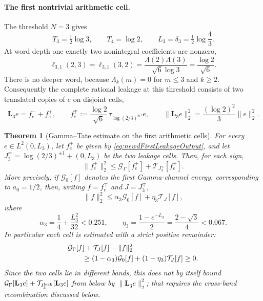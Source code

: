 \documentclass[11pt]{amsart}
\newtheorem{theorem}{Theorem}[section]
\theoremstyle{definition}
\theoremstyle{remark}
\begin{document}
\paragraph{The first nontrivial arithmetic cell.}
The threshold $N=3$ gives
\begin{equation}\label{eq:newdFirstCellLength}
 T_3=\tfrac12\log3,
 \qquad T_4=\log2,
 \qquad L_3=\delta_3=\tfrac12\log\frac43.
\end{equation}
At word depth one exactly two nonintegral coefficients are nonzero,
\begin{equation}\label{eq:newdFirstLeakageCoefficient}
 \ell_{3,1}(2,3)=\ell_{3,1}(3,2)
 =\frac{\Lambda(2)\Lambda(3)}{\sqrt6\log3}
 =\frac{\log2}{\sqrt6}.
\end{equation}
There is no deeper word, because $\Lambda_k(m)=0$ for $m\leq3$ and
$k\geq2$.  Consequently the complete rational leakage at this threshold
consists of two translated copies of $e$ on disjoint cells,
\begin{equation}\label{eq:newdFirstLeakageOutput}
 \mathbf L_3e=f_e^-+f_e^+,
 \qquad
 f_e^{\mp}:=\frac{\log2}{\sqrt6}\,\tau_{\log(2/3)^{\pm1}}e,
 \qquad
 \|\mathbf L_3e\|_2^2=\frac{(\log2)^2}{3}\|e\|_2^2.
\end{equation}
\begin{theorem}[Gamma--Tate estimate on the first arithmetic cells]
\label{thm:newdFirstCellPayment}
For every $e\in L^2(0,L_3)$, let $f_e^{\mp}$ be given by
\eqref{eq:newdFirstLeakageOutput}, and let $J_3^{\mp}=\log(2/3)^{\pm1}+(0,L_3)$
be the two leakage cells.  Then, for each sign,
\begin{equation}\label{eq:newdFirstCellPayment}
 \|f_e^{\mp}\|_2^2
 \leq \mathcal G_\Gamma[f_e^{\mp}]+\mathcal T_{J_3^{\mp}}[f_e^{\mp}].
\end{equation}
More precisely, if $\mathcal G_{0}[f]$ denotes the first Gamma-channel
energy, corresponding to $a_0=1/2$, then, writing $f=f_e^{\mp}$ and
$J=J_3^{\mp}$,
\begin{equation}\label{eq:newdFirstCellStrictPayment}
 \|f\|_2^2
 \leq \alpha_3\mathcal G_0[f]
       +\eta_3\mathcal T_{J}[f],
\end{equation}
where
\begin{equation}\label{eq:newdFirstCellConstants}
 \alpha_3=\frac14+\frac{L_3^2}{32}<0.251,
 \qquad
 \eta_3=\frac{1-e^{-L_3}}2
       =\frac{2-\sqrt3}{4}<0.067.
\end{equation}
In particular each cell is estimated with a strict positive remainder:
\begin{align}
 &\mathcal G_\Gamma[f]+\mathcal T_{J}[f]
       -\|f\|_2^2                              \notag\\
 &\qquad\geq
 (1-\alpha_3)\mathcal G_0[f]
 +(1-\eta_3)\mathcal T_{J}[f]\geq0.
 \label{eq:newdFirstCellRemainder}
\end{align}
Since the two cells lie in different bands, this does not by itself bound
$\mathcal G_\Gamma[\mathbf L_3e]+\mathcal T_{I_3^{\rm leak}}[\mathbf L_3e]$ from below
by $\|\mathbf L_3e\|_2^2$; that requires the cross-band recombination
discussed below.
\end{theorem}
\end{document}
